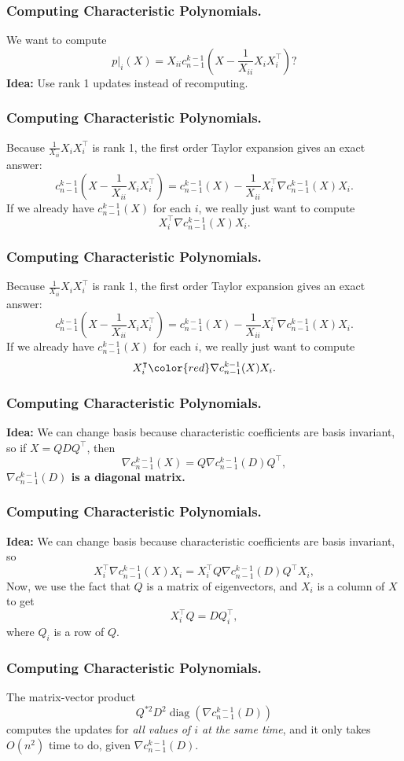 \documentclass{beamer}
\DeclareMathOperator*{\diag}{diag}
\begin{document}
\begin{frame}
    \frametitle{Computing Characteristic Polynomials.}
    We want to compute
    \[
        p|_i(X) = X_{ii} c_{n-1}^{k-1}(X - \frac{1}{X_{ii}}X_iX_i^{\intercal})?
    \]
    \textbf{Idea: } Use rank 1 updates instead of recomputing.
\end{frame}
\begin{frame}
    \frametitle{Computing Characteristic Polynomials.}
    Because $\frac{1}{X_{ii}}X_iX_i^{\intercal}$ is rank 1, the first order Taylor expansion gives an exact answer:
    \[
        c_{n-1}^{k-1}(X - \frac{1}{X_{ii}}X_iX_i^{\intercal}) = c_{n-1}^{k-1}(X)  - \frac{1}{X_{ii}}X_i^{\intercal}\nabla c_{n-1}^{k-1}(X)X_i.
    \]
    If we already have $c_{n-1}^{k-1}(X)$ for each $i$, we really just want to compute
    \[
        X_i^{\intercal}\nabla c_{n-1}^{k-1}(X)X_i.
    \]
\end{frame}
\begin{frame}
    \frametitle{Computing Characteristic Polynomials.}
    Because $\frac{1}{X_{ii}}X_iX_i^{\intercal}$ is rank 1, the first order Taylor expansion gives an exact answer:
    \[
        c_{n-1}^{k-1}(X - \frac{1}{X_{ii}}X_iX_i^{\intercal}) = c_{n-1}^{k-1}(X)  - \frac{1}{X_{ii}}X_i^{\intercal}\nabla c_{n-1}^{k-1}(X)X_i.
    \]
    If we already have $c_{n-1}^{k-1}(X)$ for each $i$, we really just want to compute
    \[
        X_i^{\intercal}{\color{red}\nabla c_{n-1}^{k-1}(X)}X_i.
    \]
\end{frame}
\begin{frame}
    \frametitle{Computing Characteristic Polynomials.}
    \textbf{Idea:} We can change basis because characteristic coefficients are basis invariant, so if $X = QDQ^{\intercal}$, then
    \[
        \nabla c_{n-1}^{k-1}(X) = Q\nabla c_{n-1}^{k-1}(D)Q^{\intercal},
    \]
    \textbf{$\nabla c_{n-1}^{k-1}(D)$ is a diagonal matrix.}
\end{frame}
\begin{frame}
    \frametitle{Computing Characteristic Polynomials.}
    \textbf{Idea:} We can change basis because characteristic coefficients are basis invariant, so
    \[
        X_i^{\intercal}\nabla c_{n-1}^{k-1}(X)X_i = X_i^{\intercal}Q\nabla c_{n-1}^{k-1}(D)Q^{\intercal}X_i,
    \]
    \pause
    Now, we use the fact that $Q$ is a matrix of eigenvectors, and $X_i$ is a column of $X$ to get
    \[
        X_i^{\intercal}Q = DQ_i^{\intercal},
    \]
    where $Q_i$ is a row of $Q$.
\end{frame}
\begin{frame}
    \frametitle{Computing Characteristic Polynomials.}
    The matrix-vector product
    \[
        Q^{*2}D^2\diag(\nabla c_{n-1}^{k-1}(D))
    \]
    computes the updates for \emph{all values of $i$ at the same time}, and it only takes $O(n^2)$ time to do, given $\nabla c_{n-1}^{k-1}(D)$.
\end{frame}
\end{document}
